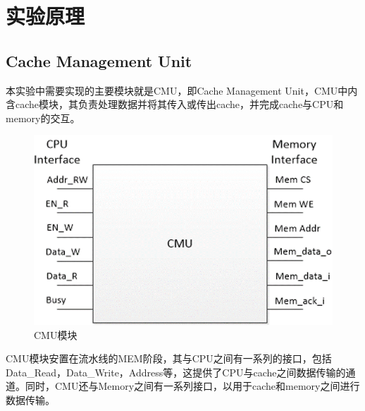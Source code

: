 
\section{实验原理}
\subsection{Cache Management Unit}
本实验中需要实现的主要模块就是CMU，即Cache Management Unit，CMU中内含cache模块，其负责处理数据并将其传入或传出cache，并完成cache与CPU和memory的交互。
\begin{figure}[H] %
	\centering %
	\includegraphics[width=1.0\textwidth]{figs/1.png} %
	\caption{CMU模块} %
	\label{Fig.1} %
\end{figure}
CMU模块安置在流水线的MEM阶段，其与CPU之间有一系列的接口，包括Data\_Read，Data\_Write，Address等，这提供了CPU与cache之间数据传输的通道。同时，CMU还与Memory之间有一系列接口，以用于cache和memory之间进行数据传输。
